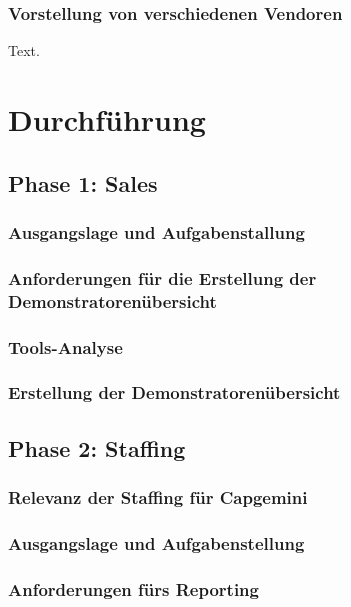 \documentclass[a4paper, 12pt]{scrartcl}
\begin{document}
	\subsubsection{Vorstellung von verschiedenen Vendoren}
	Text.
	\newpage
	\section{Durchführung}
	\subsection{Phase 1: Sales} 
	\subsubsection{Ausgangslage und Aufgabenstallung} %
	\subsubsection{Anforderungen für die Erstellung der Demonstratorenübersicht} %
	\subsubsection{Tools-Analyse}%
	\subsubsection{Erstellung der Demonstratorenübersicht}
	\newpage
	\subsection{Phase 2: Staffing}
	\subsubsection{Relevanz der Staffing für Capgemini}%
	\subsubsection{Ausgangslage und Aufgabenstellung}
	\subsubsection{Anforderungen fürs Reporting}
\end{document}

